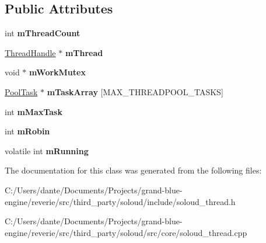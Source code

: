 \subsection*{Public Attributes}
\begin{DoxyCompactItemize}
\item 
\mbox{\label{class_so_loud_1_1_thread_1_1_pool_aff7a689de8e7831fab6b1496f97016dd}} 
int {\bfseries m\+Thread\+Count}
\item 
\mbox{\label{class_so_loud_1_1_thread_1_1_pool_a445d8cdf6c314538cbe47f36f088e112}} 
\mbox{\hyperlink{struct_so_loud_1_1_thread_1_1_thread_handle_data}{Thread\+Handle}} $\ast$ {\bfseries m\+Thread}
\item 
\mbox{\label{class_so_loud_1_1_thread_1_1_pool_a257fdfeb3ecfcdb93b60f948a0ddb1c9}} 
void $\ast$ {\bfseries m\+Work\+Mutex}
\item 
\mbox{\label{class_so_loud_1_1_thread_1_1_pool_a7a0beae198e4de16e49b17110f935935}} 
\mbox{\hyperlink{class_so_loud_1_1_thread_1_1_pool_task}{Pool\+Task}} $\ast$ {\bfseries m\+Task\+Array} \mbox{[}M\+A\+X\+\_\+\+T\+H\+R\+E\+A\+D\+P\+O\+O\+L\+\_\+\+T\+A\+S\+KS\mbox{]}
\item 
\mbox{\label{class_so_loud_1_1_thread_1_1_pool_a457c4430ce72c07abadcc14a8330325b}} 
int {\bfseries m\+Max\+Task}
\item 
\mbox{\label{class_so_loud_1_1_thread_1_1_pool_aeef706e198f929175731b02163499e9e}} 
int {\bfseries m\+Robin}
\item 
\mbox{\label{class_so_loud_1_1_thread_1_1_pool_a5577710eeb7c2dc51a5a3118734e815b}} 
volatile int {\bfseries m\+Running}
\end{DoxyCompactItemize}


The documentation for this class was generated from the following files\+:\begin{DoxyCompactItemize}
\item 
C\+:/\+Users/dante/\+Documents/\+Projects/grand-\/blue-\/engine/reverie/src/third\+\_\+party/soloud/include/soloud\+\_\+thread.\+h\item 
C\+:/\+Users/dante/\+Documents/\+Projects/grand-\/blue-\/engine/reverie/src/third\+\_\+party/soloud/src/core/soloud\+\_\+thread.\+cpp\end{DoxyCompactItemize}
